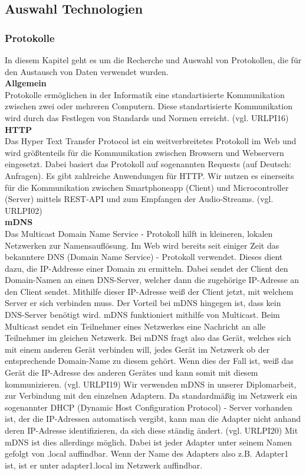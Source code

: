 \documentclass[11pt, twoside]{article}
\begin{document}
\subsection{Auswahl Technologien}
\subsubsection{Protokolle}
In diesem Kapitel geht es um die Recherche und Auswahl von Protokollen, die für den Austausch von Daten verwendet wurden. \newline \\
\textbf{Allgemein} \\
Protokolle ermöglichen in der Informatik eine standartisierte Kommunikation zwischen zwei oder mehreren Computern. Diese standartisierte Kommunikation wird durch das Festlegen von Standards und Normen erreicht. (vgl. URLPI16)
\newline \\
\textbf{HTTP} \\
Das Hyper Text Transfer Protocol ist ein weitverbreitetes Protokoll im Web und wird größtenteils für die Kommunikation zwischen Browsern und Webservern eingesetzt. Dabei basiert das Protokoll auf sogenannten \glqq Requests\grqq{} (auf Deutsch: Anfragen). Es gibt zahlreiche Anwendungen für HTTP. Wir nutzen es einerseits für die Kommunikation zwischen Smartphoneapp (Client) und Microcontroller (Server) mittels REST-API und zum Empfangen der Audio-Streams. (vgl. URLPI02)
\newline \\
\textbf{mDNS} \\
Das Multicast Domain Name Service - Protokoll hilft in kleineren, lokalen Netzwerken zur Namensauflösung. Im Web wird bereits seit einiger Zeit das bekanntere DNS (Domain Name Service) - Protokoll verwendet. Dieses dient dazu, die IP-Addresse einer Domain zu ermitteln. Dabei sendet der Client den Domain-Namen an einen DNS-Server, welcher dann die zugehörige IP-Adresse an den Client sendet. Mithilfe dieser IP-Adresse weiß der Client jetzt, mit welchem Server er sich verbinden muss. Der Vorteil bei mDNS hingegen ist, dass kein DNS-Server benötigt wird. mDNS funktioniert mithilfe von Multicast. Beim Multicast sendet ein Teilnehmer eines Netzwerkes eine Nachricht an alle Teilnehmer im gleichen Netzwerk. Bei mDNS fragt also das Gerät, welches sich mit einem anderen Gerät verbinden will, jedes Gerät im Netzwerk ob der entsprechende Domain-Name zu diesem gehört. Wenn dies der Fall ist, weiß das Gerät die IP-Adresse des anderen Gerätes und kann somit mit diesem kommunizieren. (vgl. URLPI19) Wir verwenden mDNS in unserer Diplomarbeit, zur Verbindung mit den einzelnen Adaptern. Da standardmäßig im Netzwerk ein sogenannter DHCP (Dynamic Host Configuration Protocol) - Server vorhanden ist, der die IP-Adressen automatisch vergibt, kann man die Adapter nicht anhand deren IP-Adresse identifizieren, da sich diese ständig ändert. (vgl. URLPI20) Mit mDNS ist dies allerdings möglich. Dabei ist jeder Adapter unter seinem Namen gefolgt von .local auffindbar. Wenn der Name des Adapters also z.B. Adapter1 ist, ist er unter adapter1.local im Netzwerk auffindbar.
\end{document}
